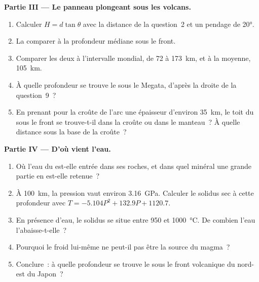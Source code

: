 \begin{problem}
\medskip
\noindent\textbf{Partie III --- Le panneau plongeant sous les volcans.}
\begin{enumerate}[resume]
  \item Calculer $H = d\tan\theta$ avec la distance de la question~2 et un
        pendage de \ang{20}.
  \item La comparer à la profondeur médiane sous le front.
  \item Comparer les deux à l'intervalle mondial, de 72 à \qty{173}{km}, et
        à la moyenne, \qty{105}{km}.
  \item À quelle profondeur se trouve le  sous le Megata, d'après la
        droite de la question~9~?
  \item En prenant pour la croûte de l'arc une épaisseur d'environ
        \qty{35}{km}, le toit du  sous le front se trouve-t-il dans
        la croûte ou dans le manteau~? À quelle distance sous la base de la
        croûte~?
\end{enumerate}

\medskip
\noindent\textbf{Partie IV --- D'où vient l'eau.}
\begin{enumerate}[resume]
  \item Où l'eau du  est-elle entrée dans ses roches, et
        dans quel minéral une grande partie en est-elle retenue~?
  \item À \qty{100}{km}, la pression vaut environ \qty{3.16}{GPa}. Calculer
        le solidus sec à cette profondeur avec $T = -5.104P^2 + 132.9P + 1120.7$.
  \item En présence d'eau, le solidus se situe entre 950 et
        \qty{1000}{\celsius}. De combien l'eau l'abaisse-t-elle~?
  \item Pourquoi le  froid lui-même ne peut-il pas être la source du
        magma~?
  \item Conclure~: à quelle profondeur se trouve le  sous
        le front volcanique du nord-est du Japon~?
\end{enumerate}
\end{problem}
